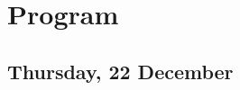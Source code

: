 \documentclass[
	openany, %
	parskip=full, %
	12pt, %
	a4paper, %
]{conferencebooklet} %
\begin{document}

\chapter{Program}

\section{Thursday, 22 December}


\end{document}
